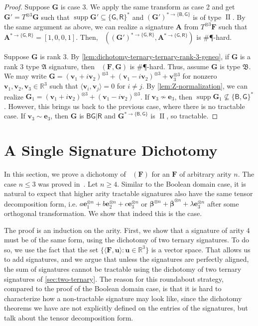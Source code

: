\documentclass[11pt]{article}
\DeclareMathOperator{\holbs}{Holant^*_2}
\DeclareMathOperator{\holts}{Holant^*_3}
\DeclareMathOperator{\supp}{supp}
\DeclareMathOperator{\typeii}{II}
\newcommand{\db}{\mathsf{B}}
\newcommand{\dg}{\mathsf{G}}
\newcommand{\dr}{\mathsf{R}}
\newcommand{\sph}{\#\P-hard\xspace}
\newcommand{\teh}{^{\otimes 3}}
\newcommand{\domres}[1]{
  ^{*\to\{#1\}}
}
\newcommand{\ternarytractgeneq}{$\mathfrak{A}$\xspace}
\newcommand{\ternarytractz}{$\mathfrak{B}$\xspace}
\begin{document}
\begin{proof}
  Suppose $\mathbf{G}$ is case 3.
  We apply the same transform as case 2 and get $\mathbf{G}' = T \teh \mathbf{G}$ such that $\supp \mathbf{G}' \subseteq \{\dg, \dr\}^*$ and $(\mathbf{G}')\domres{\db, \dg}$ is of type $\typeii$. By the same argument as above,
  we can realize a signature $\mathbf{A}$ from $T \teh \mathbf{F}$ such that $\mathbf{A}\domres{\dg, \dr} = [1, 0, 0, 1]$.
  Then, $\holbs((\mathbf{G}')\domres{\dg, \dr}, \mathbf{A}\domres{\dg, \dr})$ is \sph. 

  Suppose $\mathbf{G}$ is rank $3$.
  By \cref{lem:dichotomy-ternary-ternary-rank-3-geneq}, if $\mathbf{G}$ is a rank $3$ type \ternarytractgeneq signature, then $\holts(\mathbf{F}, \mathbf{G})$ is \sph.
  Thus, assume $\mathbf{G}$ is type \ternarytractz. 
  We may write $\mathbf{G} = (\mathbf{v}_1 + i \mathbf{v}_2) \teh + (\mathbf{v}_1 - i \mathbf{v}_2)\teh + \mathbf{v}_3\teh$ for nonzero $\mathbf{v}_1, \mathbf{v}_2, \mathbf{v}_3 \in \mathbb{R}^3$ such that $\langle \mathbf{v}_i, \mathbf{v}_j \rangle = 0$ for $i \ne j$.
  By \cref{lem:Z-normalization}, we can realize $\mathbf{G}_1 = (\mathbf{v}_1 + i \mathbf{v}_2)\teh + (\mathbf{v}_1 - i \mathbf{v}_2)\teh$.
  If $\mathbf{v}_3 \not \sim \mathbf{e}_3$, then $\supp \mathbf{G}_1 \not \subseteq \{\db, \dg\}^*$.
  However, this brings us back to the previous case, where there is no tractable case.
  If $\mathbf{v}_3 \sim \mathbf{e}_3$, then $\mathbf{G}$ is $\db \dg | \dr$ and $\mathbf{G}\domres{\db, \dg}$ is $\typeii$, so tractable.
\end{proof}
 
\section{A Single Signature Dichotomy}\label{sec:higher-arity}
In this section, we prove a dichotomy of $\holts(\mathbf{F})$ for an  
$\mathbf{F}$ of arbitrary arity $n$. The case $n\le 3$ was proved
in~\cite{cai_dichotomy_2013}. Let $n \ge 4$.
Similar to the Boolean domain case, it is natural to expect that higher arity tractable signatures also have the same tensor decomposition form, i.e. $a\mathbf{e}_1^{\otimes n} + b\mathbf{e}_2^{\otimes n} + c\mathbf{e}_3^{\otimes n}$ or $\boldsymbol{\beta}^{\otimes n} + \overline{\boldsymbol{\beta}}^{\otimes n} + \lambda \mathbf{e}_3^{\otimes n}$ after some orthogonal transformation.
We show that indeed this is the case.

The proof is an induction on the arity.
First, we show that a signature of arity $4$ must be of the same form, using the dichotomy of two ternary signatures.
To do so, we use the fact that the set $\{\langle \mathbf{F}, \mathbf{u} \rangle : \mathbf{u} \in \mathbb{R}^3\}$ is a vector space.
That allows us to add signatures, and we argue that unless the signatures are perfectly aligned, the sum of signatures cannot be tractable using the dichotomy of two ternary signatures of \cref{sec:two-ternary}.
The reason for this roundabout strategy, compared to the proof of the Boolean domain case, is that it is hard to characterize how a non-tractable signature may look like,
since the dichotomy theorems we have are not explicitly defined on the entries of the signatures, but talk about the tensor decomposition form.
\end{document}
